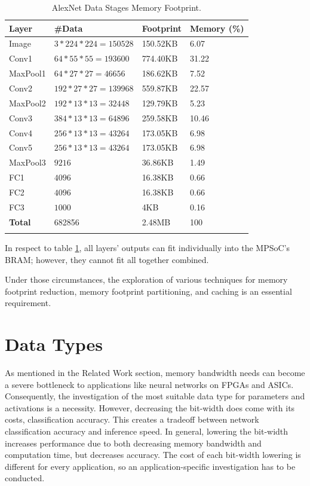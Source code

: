 \begin{table}[H]
	\caption{AlexNet Data Stages Memory Footprint.}
	\label{tab:AlexNet-Data-Stages-Memory-Footprint}
	\centering
	\begin{tabular}{llll}
		\toprule
		\textbf{Layer} & \textbf{\#Data} & \textbf{Footprint} & \textbf{Memory (\%)}  \\
		\midrule
			Image & $3 * 224 * 224 = 150528$ & 150.52KB & 6.07 \\
			Conv1 & $64 * 55 * 55 = 193600$ & 774.40KB & 31.22 \\
			MaxPool1 & $64 * 27 * 27 = 46656$ & 186.62KB & 7.52 \\
			Conv2 & $192 * 27 * 27 = 139968$ & 559.87KB & 22.57 \\
			MaxPool2 & $192 * 13 * 13 = 32448$ & 129.79KB & 5.23 \\
			Conv3 & $384 * 13 * 13 = 64896$ & 259.58KB & 10.46 \\
			Conv4 & $256 * 13 * 13 = 43264$ & 173.05KB & 6.98 \\
			Conv5 & $256 * 13 * 13 = 43264$ & 173.05KB & 6.98 \\
			MaxPool3 & $9216$ & 36.86KB & 1.49 \\
			FC1 & $4096$ & 16.38KB & 0.66 \\
			FC2 & $4096$ & 16.38KB & 0.66 \\
			FC3 & $1000$ & 4KB & 0.16 \\
		\midrule
			\textbf{Total} & 682856 & 2.48MB & 100 \\
		\bottomrule\\
	\end{tabular}
\end{table}

In respect to table \ref{tab:AlexNet-Data-Stages-Memory-Footprint}, all layers' outputs can fit individually into the MPSoC's BRAM; however, they cannot fit all together combined.

Under those circumstances, the exploration of various techniques for memory footprint reduction, memory footprint partitioning, and caching is an essential requirement.

\section{Data Types}
As mentioned in the Related Work section, memory bandwidth needs can become a severe bottleneck to applications like neural networks on FPGAs and ASICs. Consequently, the investigation of the most suitable data type for parameters and activations is a necessity. However, decreasing the bit-width does come with its costs, classification accuracy. This creates a tradeoff between network classification accuracy and inference speed. In general, lowering the bit-width increases performance due to both decreasing memory bandwidth and computation time, but decreases accuracy. The cost of each bit-width lowering is different for every application, so an application-specific investigation has to be conducted.

